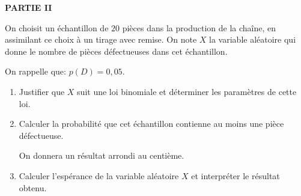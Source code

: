 \textbf{PARTIE II}

\medskip

On choisit un échantillon de $20$ pièces dans la production de la chaîne, en assimilant
ce choix à un tirage avec remise. On note $X $ la variable aléatoire qui donne le nombre
de pièces défectueuses dans cet échantillon.

On rappelle que: $p(D) = 0,05$.

\medskip

\begin{enumerate}
\item  Justifier que $X$ suit une loi binomiale et déterminer les paramètres de cette loi.
\item Calculer la probabilité que cet échantillon contienne au moins une pièce défectueuse.

On donnera un résultat arrondi au centième.
\item Calculer l'espérance de la variable aléatoire $X$ et interpréter le résultat obtenu.

\end{enumerate}

\vspace{0,5cm}

